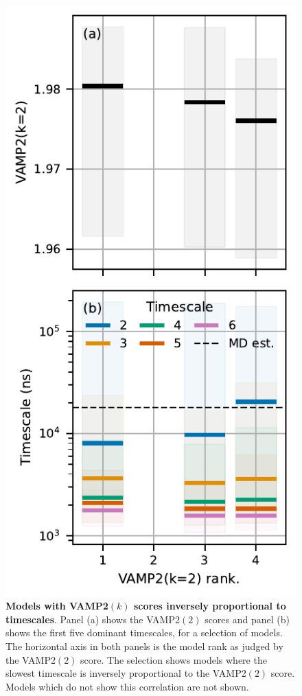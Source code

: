 \documentclass[journal=jacsat,manuscript=article]{achemso}
\begin{document}
\begin{figure}[ht]
    \centering
    \includegraphics{results2/bad_vamp_ranks.pdf}
    \caption{\textbf{Models with VAMP2$(k)$ scores inversely proportional to timescales}. Panel (a) shows the VAMP2$(2)$ scores and panel (b) shows the first five dominant timescales, for a selection of models.  The horizontal axis in both panels is the model rank as judged by the VAMP2$(2)$ score. The selection shows models where the slowest timescale is inversely proportional to the VAMP2$(2)$ score. Models which do not show this correlation are not shown. }
    \label{fig:bad_vamp_scores}
\end{figure}
\end{document}

